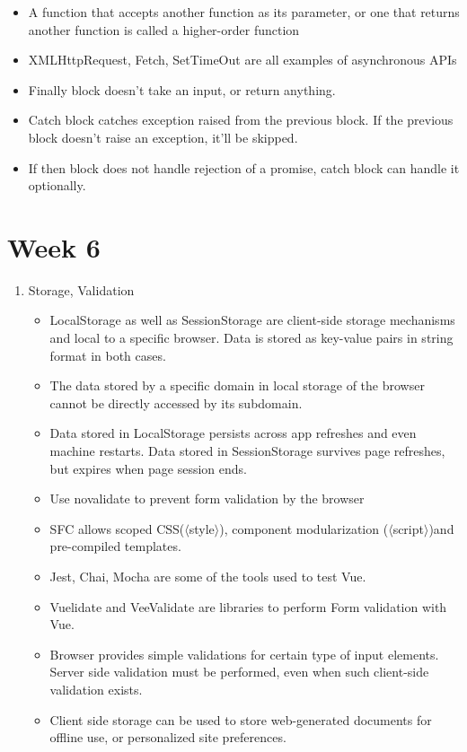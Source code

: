 \documentclass[a4paper]{article}
\begin{document}
\begin{enumerate}
\begin{itemize}
        \item A function that accepts another function as its parameter, or one that returns another function is called a higher-order function
        \item XMLHttpRequest, Fetch, SetTimeOut  are all examples of asynchronous APIs
        \item Finally block doesn’t take an input, or return anything.
        \item Catch  block catches exception raised from the previous block. If the previous block doesn’t raise an exception, it’ll be skipped.
        \item If then block does not handle rejection of a promise, catch  block can handle it optionally.
    \end{itemize}
\end{enumerate}
\section{Week 6}
\begin{enumerate}
    \item Storage, Validation
    \begin{itemize}
        \item LocalStorage as well as SessionStorage are client-side storage mechanisms and local to a specific browser. Data is stored as key-value pairs in string format  in both cases.
        \item The data stored by a specific domain in local storage of the browser cannot be directly accessed by its subdomain.
        \item Data stored in LocalStorage  persists across app refreshes and even machine restarts. Data stored in SessionStorage survives page refreshes, but expires when page session ends.
        \item Use novalidate  to prevent form validation by the browser
        \item SFC allows scoped  CSS($\langle$style$\rangle$), component modularization ($\langle$script$\rangle$)and pre-compiled  templates.
        \item Jest, Chai, Mocha are some of the tools used to test Vue.
        \item Vuelidate and VeeValidate are libraries to perform Form validation with Vue.
        \item Browser provides simple validations for certain type of input elements. Server side validation must be performed, even when such client-side validation exists. 
        \item Client side storage can be used to store web-generated documents for offline  use, or personalized site preferences.
    \end{itemize}
\end{enumerate}
\end{document}
